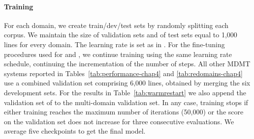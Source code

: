 \paragraph{Training} For each domain, we create train/dev/test sets by randomly splitting each corpus. We maintain the size of validation sets and of test sets equal to 1,000 lines for every domain.
The learning rate is set
as in \cite{Vaswani17attention}. For the fine-tuning procedures used for  and , we continue training using the same learning rate schedule, continuing the incrementation of the number of steps. All other MDMT systems reported in Tables~\ref{tab:performance-chap4} and \ref{tab:redomains-chap4} use a combined validation set comprising 6,000 lines, obtained by merging the six development sets. For the results in Table~\ref{tab:warmrestart} we also append the validation set of  to the multi-domain validation set. In any case, training stops if either training reaches the maximum number of iterations (50,000) or the score on the validation set does not increase for three consecutive evaluations. We average five checkpoints to get the final model.


